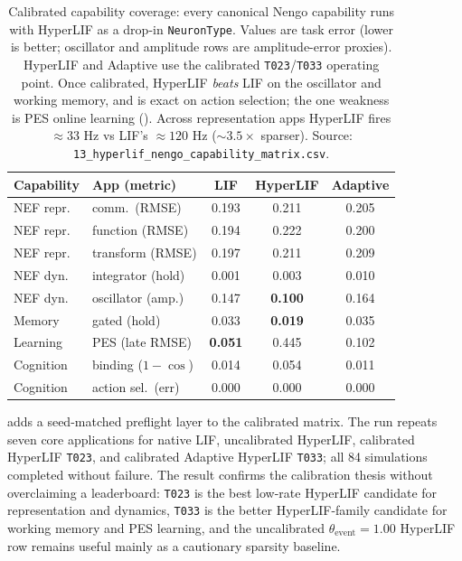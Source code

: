 \documentclass[11pt]{article}
\newcommand{\thetaevent}{\theta_{\mathrm{event}}}
\newcommand{\code}[1]{\texttt{#1}}
\begin{document}
\begin{table}[t]
  \centering
  \caption{Calibrated capability coverage: every canonical Nengo capability runs
  with HyperLIF as a drop-in \code{NeuronType}. Values are task error (lower is
  better; oscillator and amplitude rows are amplitude-error proxies). HyperLIF
  and Adaptive use the calibrated \code{T023}/\code{T033} operating point. Once
  calibrated, HyperLIF \emph{beats} LIF on the oscillator and working memory, and
  is exact on action selection; the one weakness is PES online learning
  (). Across representation apps HyperLIF fires
  \(\approx 33\) Hz vs LIF's \(\approx 120\) Hz (\(\sim\!3.5\times\) sparser).
  Source: \code{13\_hyperlif\_nengo\_capability\_matrix.csv}.}
  \label{tab:capability-calib}
  \small
  \begin{tabular}{llccc}
    \toprule
    Capability & App (metric) & LIF & HyperLIF & Adaptive \\
    \midrule
    NEF repr. & comm.\ (RMSE)        & 0.193 & 0.211 & 0.205 \\
    NEF repr. & function (RMSE)      & 0.194 & 0.222 & 0.200 \\
    NEF repr. & transform (RMSE)     & 0.197 & 0.211 & 0.209 \\
    NEF dyn.  & integrator (hold)    & 0.001 & 0.003 & 0.010 \\
    NEF dyn.  & oscillator (amp.)    & 0.147 & \textbf{0.100} & 0.164 \\
    Memory    & gated (hold)         & 0.033 & \textbf{0.019} & 0.035 \\
    Learning  & PES (late RMSE)      & \textbf{0.051} & 0.445 & 0.102 \\
    Cognition & binding (\(1-\cos\)) & 0.014 & 0.054 & 0.011 \\
    Cognition & action sel.\ (err)   & 0.000 & 0.000 & 0.000 \\
    \bottomrule
  \end{tabular}
\end{table}

 adds a seed-matched preflight layer to the
calibrated matrix. The run repeats seven core applications for native LIF,
uncalibrated HyperLIF, calibrated HyperLIF \code{T023}, and calibrated Adaptive
HyperLIF \code{T033}; all 84 simulations completed without failure. The
result confirms the calibration thesis without overclaiming a leaderboard:
\code{T023} is the best low-rate HyperLIF candidate for representation and
dynamics, \code{T033} is the better HyperLIF-family candidate for working memory
and PES learning, and the uncalibrated \(\thetaevent=1.00\) HyperLIF row remains
useful mainly as a cautionary sparsity baseline.
\end{document}
